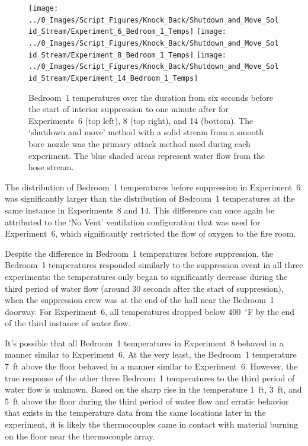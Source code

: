 \documentclass[12pt,oneside]{book}
\begin{document}
\begin{figure}[!ht]
	\centering
	\texttt{[image: ../0\_Images/Script\_Figures/Knock\_Back/Shutdown\_and\_Move\_Solid\_Stream/Experiment\_6\_Bedroom\_1\_Temps]}
	\texttt{[image: ../0\_Images/Script\_Figures/Knock\_Back/Shutdown\_and\_Move\_Solid\_Stream/Experiment\_8\_Bedroom\_1\_Temps]}
	\texttt{[image: ../0\_Images/Script\_Figures/Knock\_Back/Shutdown\_and\_Move\_Solid\_Stream/Experiment\_14\_Bedroom\_1\_Temps]}
	\caption[Shutdown \& Move with Solid Stream --- Bedroom~1 Temperatures]{Bedroom~1 temperatures over the duration from six seconds before the start of interior suppression to one minute after for Experiments~6 (top left), 8 (top right), and 14 (bottom). The `shutdown and move' method with a solid stream from a smooth bore nozzle was the primary attack method used during each experiment. The blue shaded areas represent water flow from the hose stream.}
	\label{fig:knockback_int_2}
\end{figure}

The distribution of Bedroom~1 temperatures before suppression in Experiment~6 was significantly larger than the distribution of Bedroom~1 temperatures at the same instance in Experiments~8 and 14. This difference can once again be attributed to the `No Vent' ventilation configuration that was used for Experiment~6, which significantly restricted the flow of oxygen to the fire room.

Despite the difference in Bedroom~1 temperatures before suppression, the Bedroom~1 temperatures responded similarly to the suppression event in all three experiments: the temperatures only began to significantly decrease during the third period of water flow (around 30 seconds after the start of suppression), when the suppression crew was at the end of the hall near the Bedroom~1 doorway. For Experiment~6, all temperatures dropped below 400~$^\circ$F by the end of the third instance of water flow. 

It's possible that all Bedroom~1 temperatures in Experiment~8 behaved in a manner similar to Experiment~6. At the very least, the Bedroom~1 temperature 7~ft above the floor behaved in a manner similar to Experiment~6. However, the true response of the other three Bedroom~1 temperatures to the third period of water flow is unknown. Based on the sharp rise in the temperature 1~ft, 3~ft, and 5~ft above the floor during the third period of water flow and erratic behavior that exists in the temperature data from the same locations later in the experiment, it is likely the thermocouples came in contact with material burning on the floor near the thermocouple array. 
\end{document}
